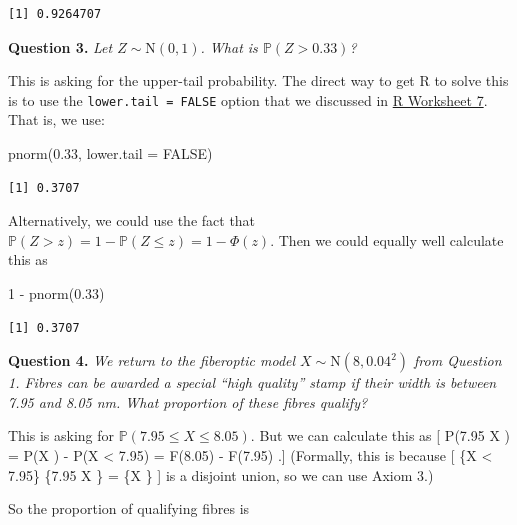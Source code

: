 \documentclass[
  letterpaper,
  DIV=11,
  numbers=noendperiod]{scrreprt}
\newenvironment{Shaded}{\begin{snugshade}}{\end{snugshade}}
\newcommand{\AttributeTok}[1]{\textcolor[rgb]{0.40,0.45,0.13}{#1}}
\newcommand{\ConstantTok}[1]{\textcolor[rgb]{0.56,0.35,0.01}{#1}}
\newcommand{\DecValTok}[1]{\textcolor[rgb]{0.68,0.00,0.00}{#1}}
\newcommand{\FloatTok}[1]{\textcolor[rgb]{0.68,0.00,0.00}{#1}}
\newcommand{\FunctionTok}[1]{\textcolor[rgb]{0.28,0.35,0.67}{#1}}
\newcommand{\NormalTok}[1]{\textcolor[rgb]{0.00,0.23,0.31}{#1}}
\newcommand{\SpecialCharTok}[1]{\textcolor[rgb]{0.37,0.37,0.37}{#1}}
\theoremstyle{remark}
\begin{document}
\begin{verbatim}
[1] 0.9264707
\end{verbatim}

\textbf{Question 3.} \emph{Let \(Z \sim \mathrm{N}(0,1)\). What is
\(\mathbb P(Z > 0.33)\)?}

This is asking for the upper-tail probability. The direct way to get R
to solve this is to use the \texttt{lower.tail\ =\ FALSE} option that we
discussed in \protect\hyperlink{r-work}{R Worksheet 7}. That is, we use:

\begin{Shaded}
\begin{Highlighting}[]
\FunctionTok{pnorm}\NormalTok{(}\FloatTok{0.33}\NormalTok{, }\AttributeTok{lower.tail =} \ConstantTok{FALSE}\NormalTok{)}
\end{Highlighting}
\end{Shaded}

\begin{verbatim}
[1] 0.3707
\end{verbatim}

Alternatively, we could use the fact that
\(\mathbb P(Z > z) = 1 - \mathbb P(Z \leq z) = 1 - \Phi(z)\). Then we
could equally well calculate this as

\begin{Shaded}
\begin{Highlighting}[]
\DecValTok{1} \SpecialCharTok{{-}} \FunctionTok{pnorm}\NormalTok{(}\FloatTok{0.33}\NormalTok{)}
\end{Highlighting}
\end{Shaded}

\begin{verbatim}
[1] 0.3707
\end{verbatim}

\textbf{Question 4.} \emph{We return to the fiberoptic model
\(X \sim \mathrm{N}(8, 0.04^2)\) from Question 1. Fibres can be awarded
a special ``high quality'' stamp if their width is between 7.95 and 8.05
nm. What proportion of these fibres qualify?}

This is asking for \(\mathbb P(7.95 \leq X \leq 8.05)\). But we can
calculate this as {[} \mathbb P(7.95 \leq X ) = \mathbb P(X
) - \mathbb P(X \textless{} 7.95) = F(8.05) - F(7.95) .{]}
(Formally, this is because {[} \{X \textless{} 7.95\} \cup \{7.95 \leq X
\} = \{X \} {]} is a disjoint union, so we can use
Axiom 3.)

So the proportion of qualifying fibres is
\end{document}
